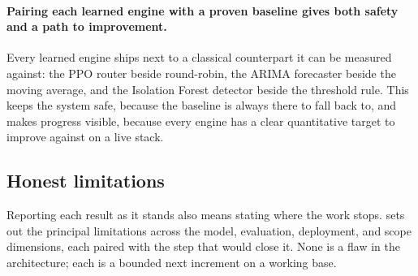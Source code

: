\paragraph{Pairing each learned engine with a proven baseline gives both safety and a
path to improvement.} Every learned engine ships next to a classical counterpart it can
be measured against: the PPO router \cite{schulman2017ppo} beside round-robin, the ARIMA
forecaster \cite{box2015timeseries} beside the moving average, and the Isolation Forest
detector \cite{liu2008isolationforest} beside the threshold rule. This keeps the system
safe, because the baseline is always there to fall back to, and makes progress visible,
because every engine has a clear quantitative target to improve against on a live stack.

\subsection{Honest limitations}
\label{conc:limitations}

Reporting each result as it stands also means stating where the work stops.
 sets out the principal limitations across the model,
evaluation, deployment, and scope dimensions, each paired with the step that would close
it. None is a flaw in the architecture; each is a bounded next increment on a working
base.

